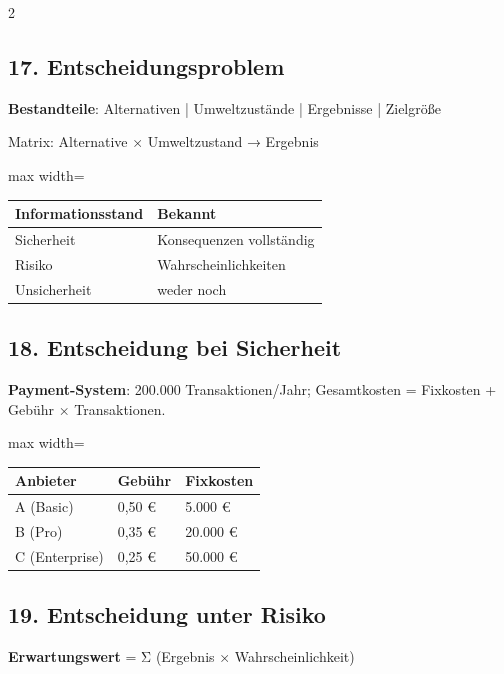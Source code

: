 \documentclass[10pt, a4paper]{article}
\begin{document}
\begin{multicols}{2}
\subsection{17. Entscheidungsproblem}

\textbf{Bestandteile}: Alternativen | Umweltzustände | Ergebnisse | Zielgröße

Matrix: Alternative × Umweltzustand → Ergebnis



{\small
\begin{adjustbox}{max width=\linewidth}
{\scriptsize
\begin{tabular}{ll}
\toprule
\textbf{Informationsstand} & \textbf{Bekannt} \\
\midrule
Sicherheit & Konsequenzen vollständig \\
Risiko & Wahrscheinlichkeiten \\
Unsicherheit & weder noch \\
\bottomrule
\end{tabular}
}
\end{adjustbox}
}



\subsection{18. Entscheidung bei Sicherheit}

\textbf{Payment-System}: 200.000 Transaktionen/Jahr; Gesamtkosten = Fixkosten + Gebühr × Transaktionen.



{\small
\begin{adjustbox}{max width=\linewidth}
{\scriptsize
\begin{tabular}{lll}
\toprule
\textbf{Anbieter} & \textbf{Gebühr} & \textbf{Fixkosten} \\
\midrule
A (Basic) & 0,50 € & 5.000 € \\
B (Pro) & 0,35 € & 20.000 € \\
C (Enterprise) & 0,25 € & 50.000 € \\
\bottomrule
\end{tabular}
}
\end{adjustbox}
}



\subsection{19. Entscheidung unter Risiko}

\textbf{Erwartungswert} = Σ (Ergebnis × Wahrscheinlichkeit)




\end{multicols}
\end{document}
